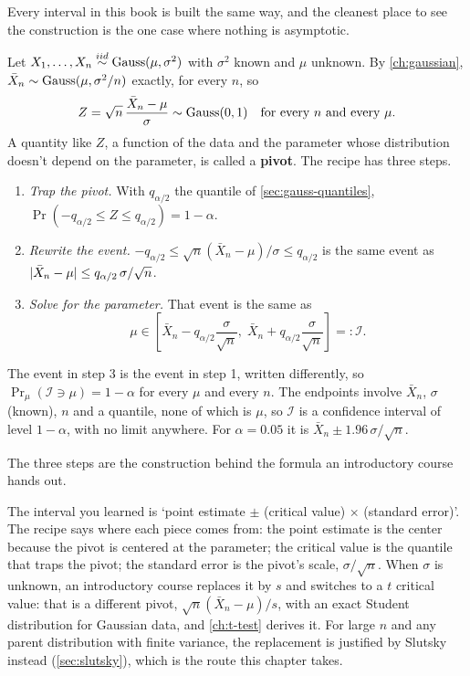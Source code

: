 Every interval in this book is built the same way, and the cleanest place to see the construction is the one case where nothing is asymptotic.

\begin{worked}
Let $X_1, \ldots, X_n \stackrel{iid}{\sim} \text{Gauss}(\mu, \sigma^2)$ with $\sigma^2$ known and $\mu$ unknown.
By \cref{ch:gaussian}, $\bar{X}_n \sim \text{Gauss}(\mu, \sigma^2/n)$ exactly, for every $n$, so
\[
Z = \sqrt{n} \, \frac{\bar{X}_n - \mu}{\sigma} \sim \text{Gauss}(0, 1) \quad \text{for every } n \text{ and every } \mu.
\]
A quantity like $Z$, a function of the data and the parameter whose distribution doesn't depend on the parameter, is called a \textbf{pivot}.
The recipe has three steps.
\begin{enumerate}[nosep]
\item \textit{Trap the pivot.} With $q_{\alpha/2}$ the quantile of \cref{sec:gauss-quantiles}, $\Pr(-q_{\alpha/2} \leq Z \leq q_{\alpha/2}) = 1 - \alpha$.
\item \textit{Rewrite the event.} $-q_{\alpha/2} \leq \sqrt{n}(\bar{X}_n - \mu)/\sigma \leq q_{\alpha/2}$ is the same event as $\lvert\bar{X}_n - \mu\rvert \leq q_{\alpha/2} \, \sigma/\sqrt{n}$.
\item \textit{Solve for the parameter.} That event is the same as
\[
\mu \in \left[ \bar{X}_n - q_{\alpha/2} \frac{\sigma}{\sqrt{n}}, \; \bar{X}_n + q_{\alpha/2} \frac{\sigma}{\sqrt{n}} \right] =: \mathcal{I}.
\]
\end{enumerate}
The event in step 3 is the event in step 1, written differently, so $\Pr_\mu(\mathcal{I} \ni \mu) = 1 - \alpha$ for every $\mu$ and every $n$.
The endpoints involve $\bar{X}_n$, $\sigma$ (known), $n$ and a quantile, none of which is $\mu$, so $\mathcal{I}$ is a confidence interval of level $1 - \alpha$, with no limit anywhere.
For $\alpha = 0.05$ it is $\bar{X}_n \pm 1.96 \, \sigma/\sqrt{n}$.
\end{worked}

The three steps are the construction behind the formula an introductory course hands out.

\begin{bridge}
The interval you learned is `point estimate $\pm$ (critical value) $\times$ (standard error)'.
The recipe says where each piece comes from: the point estimate is the center because the pivot is centered at the parameter; the critical value is the quantile that traps the pivot; the standard error is the pivot's scale, $\sigma/\sqrt{n}$.
When $\sigma$ is unknown, an introductory course replaces it by $s$ and switches to a $t$ critical value: that is a different pivot, $\sqrt{n}(\bar{X}_n - \mu)/s$, with an exact Student distribution for Gaussian data, and \cref{ch:t-test} derives it.
For large $n$ and any parent distribution with finite variance, the replacement is justified by Slutsky instead (\cref{sec:slutsky}), which is the route this chapter takes.
\end{bridge}

